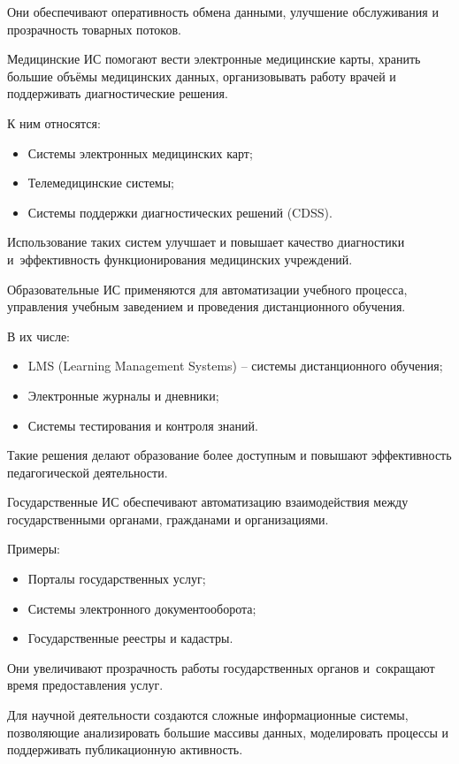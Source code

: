 \documentclass{ou}
\begin{document}
Они обеспечивают оперативность обмена данными, улучшение обслуживания и прозрачность товарных потоков.

Медицинские ИС помогают вести электронные медицинские карты, хранить большие объёмы медицинских данных, организовывать работу врачей и поддерживать диагностические решения.

К ним относятся:
\begin{itemize}[label=-, leftmargin=0em, itemindent=3.35em, nosep]
\item Системы электронных медицинских карт;
\item Телемедицинские системы;
\item Системы поддержки диагностических решений (CDSS).
\end{itemize}

Использование таких систем улучшает и повышает качество диагностики и~эффективность функционирования медицинских учреждений.

Образовательные ИС применяются для автоматизации учебного процесса, управления учебным заведением и проведения дистанционного обучения.

В их числе:
\begin{itemize}[label=-, leftmargin=0em, itemindent=3.35em, nosep]
\item LMS (Learning Management Systems) -- системы дистанционного обучения;
\item Электронные журналы и дневники;
\item Системы тестирования и контроля знаний.
\end{itemize}

Такие решения делают образование более доступным и повышают эффективность педагогической деятельности.

Государственные ИС обеспечивают автоматизацию взаимодействия между государственными органами, гражданами и организациями.

Примеры:
\begin{itemize}[label=-, leftmargin=0em, itemindent=3.35em, nosep]
\item Порталы государственных услуг;
\item Системы электронного документооборота;
\item Государственные реестры и кадастры.
\end{itemize}

Они увеличивают прозрачность работы государственных органов и~сокращают время предоставления услуг.

Для научной деятельности создаются сложные информационные системы, позволяющие анализировать большие массивы данных, моделировать процессы и поддерживать публикационную активность.
\end{document}
